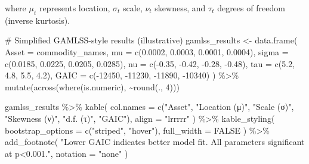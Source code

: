 \documentclass[
  10pt,
  a4paper,
]{article}
\newenvironment{Shaded}{\begin{snugshade}}{\end{snugshade}}
\newcommand{\AttributeTok}[1]{\textcolor[rgb]{0.40,0.45,0.13}{#1}}
\newcommand{\CommentTok}[1]{\textcolor[rgb]{0.37,0.37,0.37}{#1}}
\newcommand{\ConstantTok}[1]{\textcolor[rgb]{0.56,0.35,0.01}{#1}}
\newcommand{\DecValTok}[1]{\textcolor[rgb]{0.68,0.00,0.00}{#1}}
\newcommand{\FloatTok}[1]{\textcolor[rgb]{0.68,0.00,0.00}{#1}}
\newcommand{\FunctionTok}[1]{\textcolor[rgb]{0.28,0.35,0.67}{#1}}
\newcommand{\NormalTok}[1]{\textcolor[rgb]{0.00,0.23,0.31}{#1}}
\newcommand{\OtherTok}[1]{\textcolor[rgb]{0.00,0.23,0.31}{#1}}
\newcommand{\SpecialCharTok}[1]{\textcolor[rgb]{0.37,0.37,0.37}{#1}}
\newcommand{\StringTok}[1]{\textcolor[rgb]{0.13,0.47,0.30}{#1}}
\begin{document}
where \(\mu_t\) represents location, \(\sigma_t\) scale, \(\nu_t\)
skewness, and \(\tau_t\) degrees of freedom (inverse kurtosis).

\begin{Shaded}
\begin{Highlighting}[]
\CommentTok{\# Simplified GAMLSS{-}style results (illustrative)}
\NormalTok{gamlss\_results }\OtherTok{\textless{}{-}} \FunctionTok{data.frame}\NormalTok{(}
  \AttributeTok{Asset =}\NormalTok{ commodity\_names,}
  \AttributeTok{mu =} \FunctionTok{c}\NormalTok{(}\FloatTok{0.0002}\NormalTok{, }\FloatTok{0.0003}\NormalTok{, }\FloatTok{0.0001}\NormalTok{, }\FloatTok{0.0004}\NormalTok{),}
  \AttributeTok{sigma =} \FunctionTok{c}\NormalTok{(}\FloatTok{0.0185}\NormalTok{, }\FloatTok{0.0225}\NormalTok{, }\FloatTok{0.0205}\NormalTok{, }\FloatTok{0.0285}\NormalTok{),}
  \AttributeTok{nu =} \FunctionTok{c}\NormalTok{(}\SpecialCharTok{{-}}\FloatTok{0.35}\NormalTok{, }\SpecialCharTok{{-}}\FloatTok{0.42}\NormalTok{, }\SpecialCharTok{{-}}\FloatTok{0.28}\NormalTok{, }\SpecialCharTok{{-}}\FloatTok{0.48}\NormalTok{),}
  \AttributeTok{tau =} \FunctionTok{c}\NormalTok{(}\FloatTok{5.2}\NormalTok{, }\FloatTok{4.8}\NormalTok{, }\FloatTok{5.5}\NormalTok{, }\FloatTok{4.2}\NormalTok{),}
  \AttributeTok{GAIC =} \FunctionTok{c}\NormalTok{(}\SpecialCharTok{{-}}\DecValTok{12450}\NormalTok{, }\SpecialCharTok{{-}}\DecValTok{11230}\NormalTok{, }\SpecialCharTok{{-}}\DecValTok{11890}\NormalTok{, }\SpecialCharTok{{-}}\DecValTok{10340}\NormalTok{)}
\NormalTok{) }\SpecialCharTok{\%\textgreater{}\%}
  \FunctionTok{mutate}\NormalTok{(}\FunctionTok{across}\NormalTok{(}\FunctionTok{where}\NormalTok{(is.numeric), }\SpecialCharTok{\textasciitilde{}}\FunctionTok{round}\NormalTok{(., }\DecValTok{4}\NormalTok{)))}

\NormalTok{gamlss\_results }\SpecialCharTok{\%\textgreater{}\%}
  \FunctionTok{kable}\NormalTok{(}
    \AttributeTok{col.names =} \FunctionTok{c}\NormalTok{(}\StringTok{"Asset"}\NormalTok{, }\StringTok{"Location (μ)"}\NormalTok{, }\StringTok{"Scale (σ)"}\NormalTok{, }
                  \StringTok{"Skewness (ν)"}\NormalTok{, }\StringTok{"d.f. (τ)"}\NormalTok{, }\StringTok{"GAIC"}\NormalTok{),}
    \AttributeTok{align =} \StringTok{"lrrrrr"}
\NormalTok{  ) }\SpecialCharTok{\%\textgreater{}\%}
  \FunctionTok{kable\_styling}\NormalTok{(}
    \AttributeTok{bootstrap\_options =} \FunctionTok{c}\NormalTok{(}\StringTok{"striped"}\NormalTok{, }\StringTok{"hover"}\NormalTok{),}
    \AttributeTok{full\_width =} \ConstantTok{FALSE}
\NormalTok{  ) }\SpecialCharTok{\%\textgreater{}\%}
  \FunctionTok{add\_footnote}\NormalTok{(}
    \StringTok{"Lower GAIC indicates better model fit. All parameters significant at p\textless{}0.001."}\NormalTok{,}
    \AttributeTok{notation =} \StringTok{"none"}
\NormalTok{  )}
\end{Highlighting}
\end{Shaded}
\end{document}
